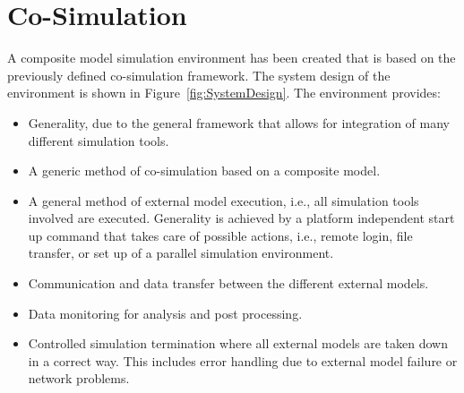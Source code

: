 \section{Co-Simulation}
A composite model simulation environment has been created that is based on the previously defined co-simulation framework. 
The system design of the environment is shown in Figure~\ref{fig:SystemDesign}. 
The environment provides:
\begin{itemize}
\item Generality, due to the general framework that allows for integration of many different simulation tools.
\item A generic method of co-simulation based on a composite model.
\item A general method of external model execution, i.e., all simulation tools involved are executed. 
Generality is achieved by a platform independent start up command that takes care of possible actions, i.e., remote login, file transfer, or set up of a parallel simulation environment.
\item Communication and data transfer between the different external models.
\item Data monitoring for analysis and post processing.
\item Controlled simulation termination where all external models are taken down in a correct way. 
This includes error handling due to external model failure or network problems.
\end{itemize}

